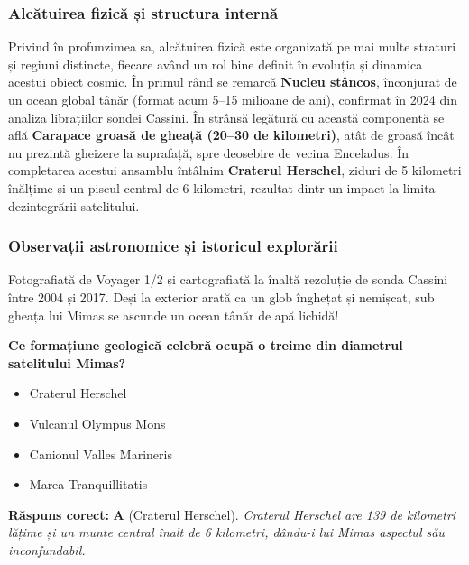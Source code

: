 \subsubsection*{Alcătuirea fizică și structura internă}
Privind în profunzimea sa, alcătuirea fizică este organizată pe mai multe straturi și regiuni distincte, fiecare având un rol bine definit în evoluția și dinamica acestui obiect cosmic. În primul rând se remarcă \textbf{Nucleu stâncos}, înconjurat de un ocean global tânăr (format acum 5--15 milioane de ani), confirmat în 2024 din analiza librațiilor sondei Cassini. În strânsă legătură cu această componentă se află \textbf{Carapace groasă de gheață (20--30 de kilometri)}, atât de groasă încât nu prezintă gheizere la suprafață, spre deosebire de vecina Enceladus. În completarea acestui ansamblu întâlnim \textbf{Craterul Herschel}, ziduri de 5 kilometri înălțime și un piscul central de 6 kilometri, rezultat dintr-un impact la limita dezintegrării satelitului.

\subsubsection*{Observații astronomice și istoricul explorării}
Fotografiată de Voyager 1/2 și cartografiată la înaltă rezoluție de sonda Cassini între 2004 și 2017. Deși la exterior arată ca un glob înghețat și nemișcat, sub gheața lui Mimas se ascunde un ocean tânăr de apă lichidă!

\vspace{6pt}
\begin{tcolorbox}[orbitarquiz, title={\textbf{Întrebare de verificare \#15: Mimas}}]
\textbf{Ce formațiune geologică celebră ocupă o treime din diametrul satelitului Mimas?}
\begin{itemize}[leftmargin=2.2em, itemsep=2pt, topsep=4pt]
  \item[$\square$ \textbf{A.}] Craterul Herschel
  \item[$\square$ \textbf{B.}] Vulcanul Olympus Mons
  \item[$\square$ \textbf{C.}] Canionul Valles Marineris
  \item[$\square$ \textbf{D.}] Marea Tranquillitatis
\end{itemize}
\vspace{2pt}
{\footnotesize\color{orbitarMuted}\textbf{Răspuns corect:} \textbf{A} (Craterul Herschel). \emph{Craterul Herschel are 139 de kilometri lățime și un munte central înalt de 6 kilometri, dându-i lui Mimas aspectul său inconfundabil.}}
\end{tcolorbox}
\clearpage


